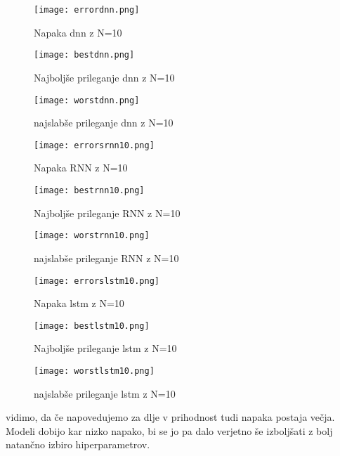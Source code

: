 \documentclass{article}
\begin{document}
\begin{figure}[htb]
    \texttt{[image: errordnn.png]}
    \caption{Napaka dnn z N=10}
\end{figure}
\begin{figure}[htb]
    \texttt{[image: bestdnn.png]}
    \caption{Najboljše prileganje dnn z N=10}
\end{figure}
\begin{figure}[htb]
    \texttt{[image: worstdnn.png]}
    \caption{najslabše prileganje dnn z N=10}
\end{figure}

\begin{figure}[htb]
    \texttt{[image: errorsrnn10.png]}
    \caption{Napaka RNN z N=10}
\end{figure}
\begin{figure}[htb]
    \texttt{[image: bestrnn10.png]}
    \caption{Najboljše prileganje RNN z N=10}
\end{figure}
\begin{figure}[htb]
    \texttt{[image: worstrnn10.png]}
    \caption{najslabše prileganje RNN z N=10}
\end{figure}

\begin{figure}[htb]
    \texttt{[image: errorslstm10.png]}
    \caption{Napaka lstm z N=10}
\end{figure}
\begin{figure}[htb]
    \texttt{[image: bestlstm10.png]}
    \caption{Najboljše prileganje lstm z N=10}
\end{figure}
\begin{figure}[htb]
    \texttt{[image: worstlstm10.png]}
    \caption{najslabše prileganje lstm z N=10}
\end{figure}

vidimo, da če napovedujemo za dlje v prihodnost tudi napaka postaja večja. Modeli dobijo kar nizko napako, bi se jo pa dalo verjetno še izboljšati z bolj natančno izbiro hiperparametrov.
\end{document}
